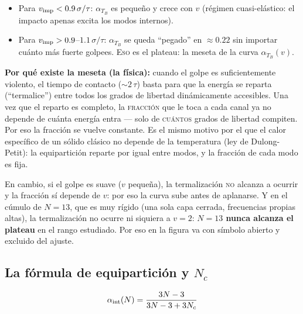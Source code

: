 \documentclass[11pt,a4paper]{article}
\begin{document}
\begin{itemize}[leftmargin=1.4em]
    \item Para $v_{\rm imp}<0.9\,\sigma/\tau$: $\alpha_{T_B}$ es pequeño
    y crece con $v$ (régimen cuasi-elástico: el impacto apenas excita los
    modos internos).
    \item Para $v_{\rm imp}>0.9$--$1.1\,\sigma/\tau$: $\alpha_{T_B}$ se
    queda ``pegado'' en $\approx0.22$ sin importar cuánto más fuerte
    golpees. \textsc{Eso} es el plateau: la meseta de la curva
    $\alpha_{T_B}(v)$.
\end{itemize}

\textbf{Por qué existe la meseta (la física):} cuando el golpe es
suficientemente violento, el tiempo de contacto ($\sim2\,\tau$) basta
para que la energía se reparta (``termalice'') entre todos los grados de
libertad dinámicamente accesibles. Una vez que el reparto es completo, la
\textsc{fracción} que le toca a cada canal ya no depende de cuánta
energía entra --- solo de \textsc{cuántos} grados de libertad compiten.
Por eso la fracción se vuelve constante. Es el mismo motivo por el que el
calor específico de un sólido clásico no depende de la temperatura (ley
de Dulong-Petit): la equipartición reparte por igual entre modos, y la
fracción de cada modo es fija.

En cambio, si el golpe es suave ($v$ pequeña), la termalización \textsc{no}
alcanza a ocurrir y la fracción sí depende de $v$: por eso la curva sube
antes de aplanarse. Y en el cúmulo de $N=13$, que es muy rígido (una sola
capa cerrada, frecuencias propias altas), la termalización no ocurre ni
siquiera a $v=2$: \textbf{$N=13$ nunca alcanza el plateau} en el rango
estudiado. Por eso en la figura va con símbolo abierto y excluido del
ajuste.

\subsection{La fórmula de equipartición y \texorpdfstring{$N_c$}{Nc}}
\label{sec:equip}

\begin{equation*}
    \alpha_{\rm int}(N) = \frac{3N-3}{3N-3+3N_c}
\end{equation*}
\end{document}
